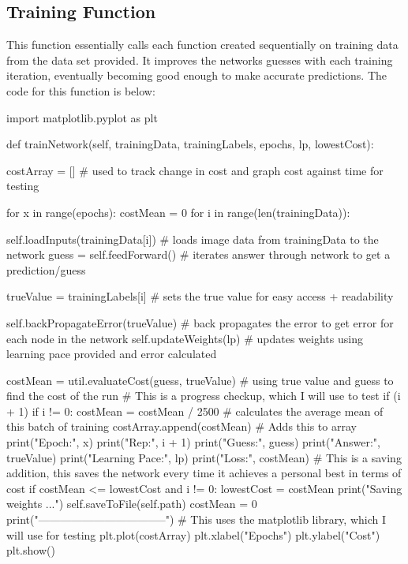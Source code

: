 \documentclass{report}
\begin{document}
\subsection{Training Function}
This function essentially calls each function created sequentially on training data from the data set provided. It improves the networks guesses with each training iteration, eventually becoming good enough to make accurate predictions. The code for this function is below:
\begin{python}
import matplotlib.pyplot as plt

def trainNetwork(self, trainingData, trainingLabels, epochs, lp, lowestCost):

    costArray = [] # used to track change in cost and graph cost against time for testing

    for x in range(epochs):
        costMean = 0
        for i in range(len(trainingData)):

            self.loadInputs(trainingData[i]) # loads image data from trainingData to the network
            guess = self.feedForward() # iterates answer through network to get a prediction/guess

            trueValue = trainingLabels[i] # sets the true value for easy access + readability

            self.backPropagateError(trueValue) # back propagates the error to get error for each node in the network
            self.updateWeights(lp) # updates weights using learning pace provided and error calculated

            costMean = util.evaluateCost(guess, trueValue) # using true value and guess to find the cost of the run
            # This is a progress checkup, which I will use to test
            if (i + 1) %
                if i != 0:
                    costMean = costMean / 2500 # calculates the average mean of this batch of training
                costArray.append(costMean) # Adds this to array
                print("Epoch:", x)
                print("Rep:", i + 1)
                print("Guess:", guess)
                print("Answer:", trueValue)
                print("Learning Pace:", lp)
                print("Loss:", costMean)
                # This is a saving addition, this saves the network every time it achieves a personal best in terms of cost
                if costMean <= lowestCost and i != 0:
                    lowestCost = costMean
                    print("Saving weights ...")
                    self.saveToFile(self.path)
                costMean = 0
                print("-----------------------------------")
    # This uses the matplotlib library, which I will use for testing 
    plt.plot(costArray)
    plt.xlabel("Epochs")
    plt.ylabel("Cost")
    plt.show()
\end{python}
\end{document}
